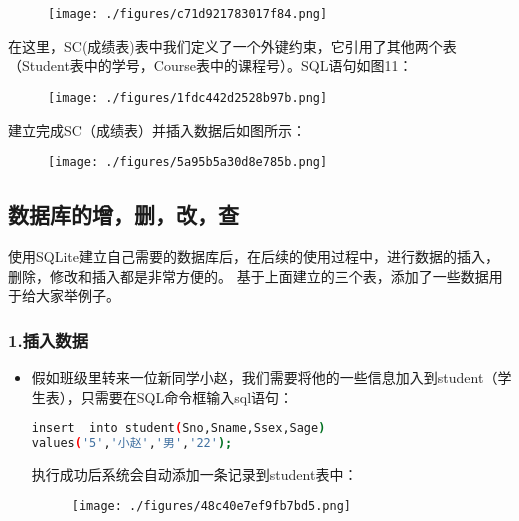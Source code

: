 \begin{figure}[ht]
\centering
\texttt{[image: ./figures/c71d921783017f84.png]}
\caption{} \label{fig_SQLint_10}
\end{figure}

在这里，SC(成绩表)表中我们定义了一个外键约束，它引用了其他两个表（Student表中的学号，Course表中的课程号）。SQL语句如图11：
\begin{figure}[ht]
\centering
\texttt{[image: ./figures/1fdc442d2528b97b.png]}
\caption{} \label{fig_SQLint_11}
\end{figure}

建立完成SC（成绩表）并插入数据后如图所示：
\begin{figure}[ht]
\centering
\texttt{[image: ./figures/5a95b5a30d8e785b.png]}
\caption{} \label{fig_SQLint_12}
\end{figure}

\subsection{数据库的增，删，改，查}
使用SQLite建立自己需要的数据库后，在后续的使用过程中，进行数据的插入，删除，修改和插入都是非常方便的。
基于上面建立的三个表，添加了一些数据用于给大家举例子。
\subsubsection{1.插入数据}

\begin{itemize}
\item 假如班级里转来一位新同学小赵，我们需要将他的一些信息加入到student（学生表），只需要在SQL命令框输入sql语句：

\begin{lstlisting}[language=bash]
insert  into student(Sno,Sname,Ssex,Sage)
values('5','小赵','男','22');
\end{lstlisting}
执行成功后系统会自动添加一条记录到student表中：
\begin{figure}[ht]
\centering
\texttt{[image: ./figures/48c40e7ef9fb7bd5.png]}
\caption{} \label{fig_SQLint_13}
\end{figure}
\end{itemize}

